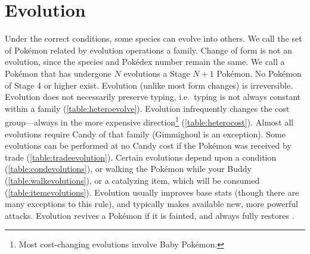 \section{Evolution\label{sec:evolution}}
Under the correct conditions, some species can evolve into others.
We call the set of Pokémon related by evolution operations a family.
Change of form is not an evolution, since the species and Pokédex number remain the same.
We call a Pokémon that has undergone $N$ evolutions a Stage $N+1$ Pokémon.
No Pokémon of Stage 4 or higher exist.
Evolution (unlike most form changes) is irreversible.
Evolution does not necessarily preserve typing, i.e.\ typing is not always constant within a family (\autoref{table:heteroevolve}).
Evolution infrequently changes the cost group---always in the more expensive direction\footnote{Most
  cost-changing evolutions involve Baby Pokémon.} (\autoref{table:heterocost}).
Almost all evolutions require Candy of that family (Gimmighoul is an exception).
Some evolutions can be performed at no Candy cost if the Pokémon was received by trade
 (\autoref{table:tradeevolution}).
Certain evolutions depend upon a condition (\autoref{table:condevolutions}),
  or walking the Pokémon while your Buddy (\autoref{table:walkevolutions}),
  or a catalyzing item, which will be consumed (\autoref{table:itemevolutions}).
Evolution usually improves base stats (though there are many exceptions to this rule),
  and typically makes available new, more powerful attacks.
Evolution revives a Pokémon if it is fainted, and always fully restores \HP\@.


